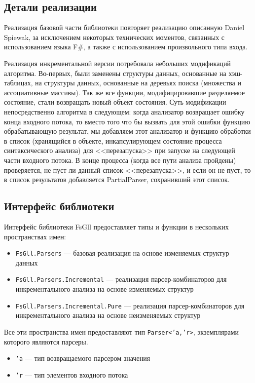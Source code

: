 \documentclass[14pt]{matmex-diploma}
\begin{document}
\subsection{Детали реализации}
Реализация базовой части библиотеки повторяет реализацию описанную Daniel Spiewak,
за исключением некоторых технических моментов, связанных с использованием языка F\#, 
а также с использованием произвольного типа входа. 

Реализация инкрементальной версии потребовала небольших модификаций алгоритма. 
Во-первых, были заменены структуры данных, основанные на хэш-таблицах, на структуры данных,
основанные на деревьях поиска
(множества и ассоциативные массивы). Так же все функции, модифицировавшие разделяемое состояние, 
стали возвращать новый объект состояния. Суть модификации непосредственно алгоритма в следующем: 
когда анализатор возвращает ошибку конца входного потока, то
вместо того что бы вызвать для этой ошибки функцию обрабатывающую результат, мы добавляем 
этот анализатор и функцию обработки в список (хранящийся в объекте, 
инкапсулирующем состояние процесса синтаксического анализа) для <<перезапуска>> при запуске на следующей части входного потока. 
В конце процесса (когда все пути анализа пройдены) проверяется, не пуст ли данный список 
<<перезапуска>>, и если он не пуст, то в список результатов 
добавляется PartialParser, сохранивший этот список.



\subsection{Интерфейс библиотеки}
Интерфейс библиотеки FsGll предоставляет типы и функции в нескольких пространствах имен:
\begin{itemize}
    \item {\tt FsGll.Parsers} --- базовая реализация на основе изменяемых структур данных
    \item {\tt FsGll.Parsers.Incremental} --- реализация парсер-комбинаторов для 
          инкрементального анализа на основе изменяемых структур
    \item {\tt FsGll.Parsers.Incremental.Pure} --- реализация парсер-комбинаторов для 
          инкрементального анализа на основе неизменяемых структур
\end{itemize}

Все эти пространства имен предоставляют тип {\tt Parser<'a,'r>}, экземплярами которого являются парсеры. 
\begin{itemize}
    \item {\tt 'a} --- тип возвращаемого парсером значения
    \item {\tt 'r} --- тип элементов входного потока
\end{itemize}
\end{document}
